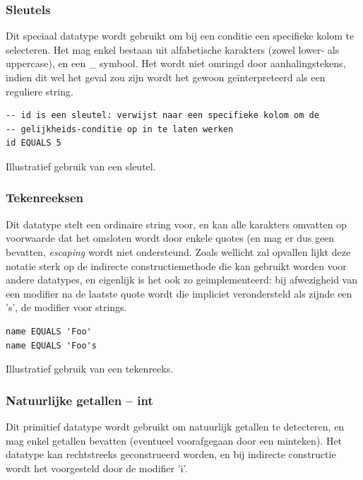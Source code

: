 \subsubsection{Sleutels}

Dit speciaal datatype wordt gebruikt om bij een conditie een specifieke kolom te selecteren. Het mag enkel bestaan uit alfabetische karakters (zowel lower- als uppercase), en een \_ symbool. Het wordt niet omringd door aanhalingstekens, indien dit wel het geval zou zijn wordt het gewoon ge\"interpreteerd als een reguliere string.

\begin{code}
\begin{verbatim}
-- id is een sleutel: verwijst naar een specifieke kolom om de
-- gelijkheids-conditie op in te laten werken
id EQUALS 5
\end{verbatim}
\caption{Illustratief gebruik van een sleutel.}
\end{code}

\subsubsection{Tekenreeksen}

Dit datatype stelt een ordinaire string voor, en kan alle karakters omvatten op voorwaarde dat het omsloten wordt door enkele quotes (en mag er dus geen bevatten, \emph{escaping} wordt niet ondersteund. Zoals wellicht zal opvallen lijkt deze notatie sterk op de indirecte constructiemethode die kan gebruikt worden voor andere datatypes, en eigenlijk is het ook zo geimplementeerd: bij afwezigheid van een modifier na de laatste quote wordt die impliciet verondersteld als zijnde een 's', de modifier voor strings.

\begin{code}
\begin{verbatim}
name EQUALS 'Foo'
name EQUALS 'Foo's
\end{verbatim}
\caption{Illustratief gebruik van een tekenreeks.}
\end{code}

\subsubsection{Natuurlijke getallen -- int}

Dit primitief datatype wordt gebruikt om natuurlijk getallen te detecteren, en mag enkel getallen bevatten (eventueel voorafgegaan door een minteken). Het datatype kan rechtstreeks geconstrueerd worden, en bij indirecte constructie wordt het voorgesteld door de modifier 'i'.

